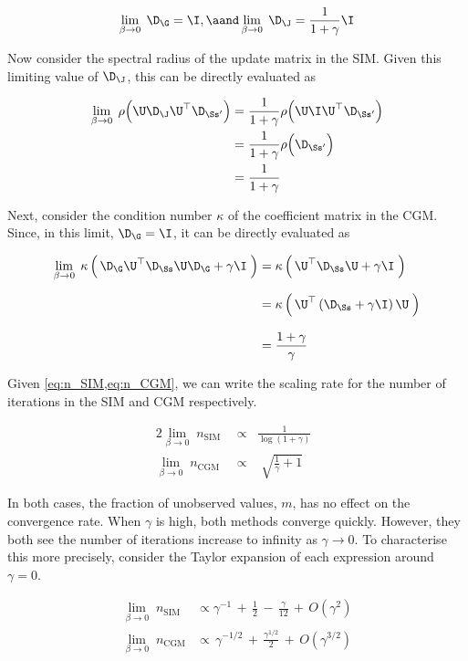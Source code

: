 $$
\lim_{\beta \rightarrow 0} \; \D_\G = \I, \aand \lim_{\beta \rightarrow 0} \; \D_\J = \frac{1}{1 + \gamma} \I
$$

Now consider the spectral radius of the update matrix in the SIM. Given this limiting value of $\D_\J$, this can be directly evaluated as

\begin{align}
    \lim_{\beta \rightarrow 0} \; \rho\Big(\U \D_\J \U^\top \D_{\Ss'} \Big) &= \frac{1}{1 + \gamma} \rho\Big(\U \I \U^\top \D_{\Ss'} \Big) \notag \\
    &= \frac{1}{1 + \gamma} \rho\Big(\D_{\Ss'} \Big) \notag \\
    &= \frac{1}{1 + \gamma} \label{eq:beta_lim_0} 
\end{align}

Next, consider the condition number $\kappa$ of the coefficient matrix in the CGM. Since, in this limit, $\D_\G = \I$, it can be directly evaluated as 


\begin{align}
    \lim_{\beta \rightarrow 0} \; \kappa \left(  \, \D_\G \U^\top \D_{\Ss} \U \D_\G + \gamma \I \; \right) &= \kappa  \left(  \, \U^\top \D_{\Ss} \U + \gamma \I \; \right) \notag \\[0.2cm]
    &= \kappa  \left(  \, \U^\top \left( \D_{\Ss} + \gamma \I \right) \U \; \right) \notag \\[0.3cm]
    &= \frac{1 + \gamma}{\gamma}
\end{align}

 Given \cref{eq:n_SIM,eq:n_CGM}, we can write the scaling rate for the number of iterations in the SIM and CGM respectively. 

\begin{alignat}{2}
    \lim_{\beta \rightarrow 0} \;  n_{\text{SIM}} \, & \propto \;\;  \frac{1}{\log(1 + \gamma)} \;\; \\[0.5cm]
    \lim_{\beta \rightarrow 0} \;  n_{\text{CGM}} \, & \propto \;\;\;  \sqrt{\frac{1}{\gamma} + 1} \; 
\end{alignat}

In both cases, the fraction of unobserved values, $m$, has no effect on the convergence rate. When $\gamma$ is high, both methods converge quickly. However, they both see the number of iterations increase to infinity as $\gamma \rightarrow 0$. To characterise this more precisely, consider the Taylor expansion of each expression around $\gamma =0$.  


\begin{align}
    \lim_{\beta \rightarrow 0} \;  n_{\text{SIM}}  \;  &\propto \gamma^{-1} \, + \, \frac{1}{2} \, - \, \frac{\gamma}{12} \, + \, O(\gamma^2) \\[0.5cm]
    \lim_{\beta \rightarrow 0} \;  n_{\text{CGM}} &\propto \, \gamma^{-1/2} \, + \, \frac{\gamma^{1/2}}{2} \, + \, O\left(\gamma^{3/2}\right) 
\end{align}

